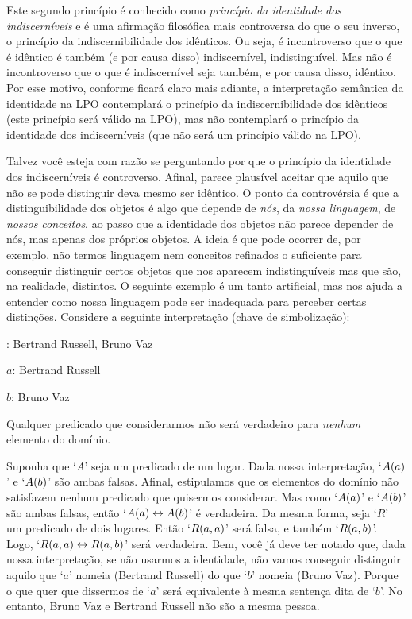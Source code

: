 Este segundo princípio é conhecido como \emph{princípio da identidade dos indiscerníveis} e é uma afirmação filosófica mais controversa do que o seu inverso, o princípio da indiscernibilidade dos idênticos.
Ou seja, é incontroverso que o que é idêntico é também (e por causa disso) indiscernível, indistinguível.
Mas não é incontroverso que o que é indiscernível seja também, e por causa disso, idêntico.
Por esse motivo, conforme ficará claro mais adiante, a interpretação semântica da identidade na LPO contemplará o princípio da indiscernibilidade dos idênticos (este princípio será válido na LPO), mas não contemplará o princípio da identidade dos indiscerníveis (que não será um princípio válido na LPO).

Talvez você esteja com razão se perguntando por que o princípio da identidade dos indiscerníveis é controverso.
Afinal, parece plausível aceitar que aquilo que não se pode distinguir deva mesmo ser idêntico.
O ponto da controvérsia é que a distinguibilidade dos objetos é algo que depende de \emph{nós}, da \emph{nossa linguagem}, de \emph{nossos conceitos}, ao passo que a identidade dos objetos não parece depender de nós, mas apenas dos próprios objetos.
A ideia é que pode ocorrer de, por exemplo, não termos linguagem nem conceitos refinados o suficiente para conseguir distinguir certos objetos que nos aparecem indistinguíveis mas que são, na realidade, distintos.
O seguinte exemplo é um tanto artificial, mas nos ajuda a entender como nossa linguagem pode ser inadequada para perceber certas distinções.
Considere a seguinte interpretação (chave de simbolização):
	\begin{center}
	\begin{ebullet}
		\item[\text{domínio}:] Bertrand Russell, Bruno Vaz
		\item[$a$:] Bertrand Russell
		\item[$b$:] Bruno Vaz
		\item Qualquer predicado que considerarmos não será verdadeiro para \emph{nenhum} elemento do domínio.
	\end{ebullet}
	\end{center}
Suponha que `$A$' seja um predicado de um lugar.
Dada nossa interpretação, `$\mathord{A}(a)$' e `$\mathord{A}(b)$' são ambas falsas.
Afinal, estipulamos que os elementos do domínio não satisfazem nenhum predicado que quisermos considerar.
Mas como `$\mathord{A}(a)$' e `$\mathord{A}(b)$' são ambas falsas, então `$\mathord{A}(a) \leftrightarrow \mathord{A}(b)$' é verdadeira.
Da mesma forma, seja `$R$' um predicado de dois lugares.
Então `$\mathord{R}(a,a)$' será falsa, e também `$\mathord{R}(a,b)$'.
Logo, `$\mathord{R}(a,a) \leftrightarrow \mathord{R}(a,b)$' será verdadeira.
Bem, você já deve ter notado que, dada nossa interpretação, se não usarmos a identidade, não vamos conseguir distinguir aquilo que `$a$' nomeia (Bertrand Russell) do que `$b$' nomeia (Bruno Vaz).
Porque o que quer que dissermos de `$a$' será equivalente à mesma sentença dita de `$b$'.
No entanto, Bruno Vaz e Bertrand Russell não são a mesma pessoa.


